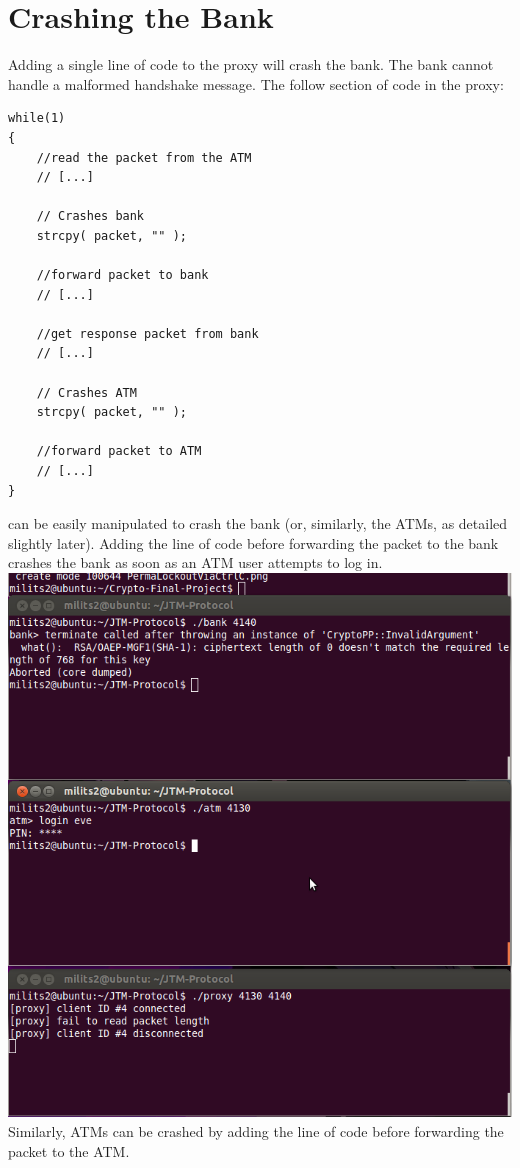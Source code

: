 \documentclass{article}
\begin{document}
\section{Crashing the Bank}
Adding a single line of code to the proxy will crash the bank. The bank cannot handle a malformed handshake message. The follow section of code in the proxy:
\begin{lstlisting}
while(1)
{
	//read the packet from the ATM
    // [...]
	
	// Crashes bank
    strcpy( packet, "" );
    
	//forward packet to bank
    // [...]
	
	//get response packet from bank
    // [...]
	
	// Crashes ATM
	strcpy( packet, "" );
	
	//forward packet to ATM
    // [...]
}
\end{lstlisting}
can be easily manipulated to crash the bank (or, similarly, the ATMs, as detailed slightly later). Adding the line of code before forwarding the packet to the bank crashes the bank as soon as an ATM user attempts to log in. 
\includegraphics{crashBank.png}
Similarly, ATMs can be crashed by adding the line of code before forwarding the packet to the ATM.
\end{document}
